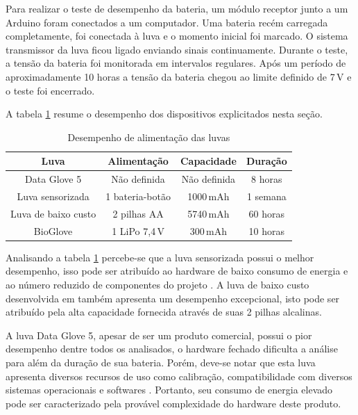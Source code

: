 \documentclass[
	12pt,				%
	openright,			%
	oneside,			%
	a4paper,			%
	english,			%
	brazil				%
	]{abntex2}
\begin{document}
			Para realizar o teste de desempenho da bateria, um módulo receptor junto a um Arduino foram conectados a um computador. Uma bateria recém carregada completamente, foi conectada à luva e o momento inicial foi marcado. O sistema transmissor da luva ficou ligado enviando sinais continuamente. Durante o teste, a tensão da bateria foi monitorada em intervalos regulares. Após um período de aproximadamente 10 horas a tensão da bateria chegou ao limite definido de 7$\,$V e o teste foi encerrado.

			A tabela \ref{Tab:battery-range} resume o desempenho dos dispositivos explicitados nesta seção.

                          

		\begin{table}[H]
  	\centering
		\caption{Desempenho de alimentação das luvas}
    \begin{tabular}{c|c|c|c}
      \midrule
			Luva 								& Alimentação			&	Capacidade	& Duração	\\
      \midrule                                            					
			Data Glove 5				& Não definida		& Não definida& 8 horas \\
			Luva sensorizada 		& 1 bateria-botão	& 1000$\,$mAh		& 1 semana\\
			Luva de baixo custo & 2 pilhas AA			& 5740$\,$mAh		& 60 horas\\
			BioGlove						& 1 LiPo 7,4$\,$V			& 300$\,$mAh			&	10 horas\\	
      \midrule
    \end{tabular}
		\label{Tab:battery-range}
		\end{table}

		Analisando a tabela \ref{Tab:battery-range} percebe-se que a luva sensorizada possui o melhor desempenho, isso pode ser atribuído ao hardware de baixo consumo de energia e ao número reduzido de componentes do projeto \cite{michela2013rehab}. A luva de baixo custo desenvolvida em \cite{simone2007lowcost} também apresenta um desempenho excepcional, isto pode ser atribuído pela alta capacidade fornecida através de suas 2 pilhas alcalinas.

		A luva Data Glove 5, apesar de ser um produto comercial, possui o pior desempenho dentre todos os analisados, o hardware fechado dificulta a análise para além da duração de sua bateria. Porém, deve-se notar que esta luva apresenta diversos recursos de uso como calibração, compatibilidade com diversos sistemas operacionais e softwares \cite{5DT-ultra}. Portanto, seu consumo de energia elevado pode ser caracterizado pela provável complexidade do hardware deste produto.
\end{document}
